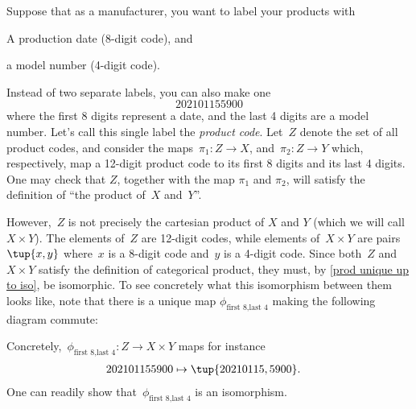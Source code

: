 \begin{example}
  \label{ex univ prop prod}
  Suppose that as a manufacturer, you want to label your products with
  \begin{compactitem}
    \item A production date (8-digit code), and
    \item a model number (4-digit code).
  \end{compactitem}
  Instead of two separate labels, you can also make one
  \begin{equation*}
    202101155900
  \end{equation*}
  where the first 8 digits represent a date, and the last 4 digits are a model number.
  Let's call this single label the \emph{product code}. Let~$Z$ denote the set of all product codes, and consider the maps~$\pi_1\colon Z\to X$, and~$\pi_2\colon Z\to Y$ which, respectively, map a 12-digit product code to its first 8 digits and its last 4 digits. One may check that $Z$, together with the map $\pi_1$ and $\pi_2$, will satisfy the definition of ``the product of~$X$ and~$Y$''.

  \begin{center}
  \end{center}

  However,~$Z$ is not precisely the cartesian product of $X$ and $Y$ (which we will call $X\times Y$). The elements of~$Z$ are 12-digit codes, while elements of~$X\times Y$ are pairs~$\tup{x,y}$ where~$x$ is a 8-digit code and~$y$ is a 4-digit code. Since both~$Z$ and~$X\times Y$ satisfy the definition of categorical product, they must, by \cref{prod unique up to iso}, be isomorphic.
  To see concretely what this isomorphism between them looks like, note that there is a unique map $\phi_{\text{first 8},\text{last 4}}$ making the following diagram commute:
  \begin{center}
  \end{center}
  
  Concretely,~$\phi_{\text{first 8},\text{last 4}}: Z \to X\times Y$ maps for instance
  \begin{equation*}
    \begin{aligned}
      202101155900&\mapsto \tup{20210115,5900}.
    \end{aligned}
  \end{equation*}
  One can readily show that~$\phi_{\text{first 8},\text{last 4}}$ is an isomorphism.
\end{example}

